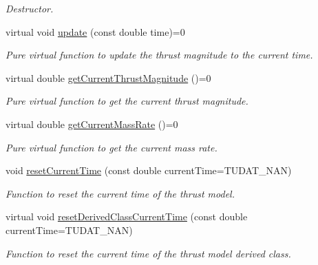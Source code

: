 \begin{DoxyCompactItemize}
\begin{DoxyCompactList}\small\item\em Destructor. \end{DoxyCompactList}\item 
virtual void \hyperlink{classtudat_1_1propulsion_1_1ThrustMagnitudeWrapper_a6a515296199563f2fcece10923d6dcca}{update} (const double time)=0
\begin{DoxyCompactList}\small\item\em Pure virtual function to update the thrust magnitude to the current time. \end{DoxyCompactList}\item 
virtual double \hyperlink{classtudat_1_1propulsion_1_1ThrustMagnitudeWrapper_a303af8ecc94a8e0151a58711700dafe2}{get\+Current\+Thrust\+Magnitude} ()=0
\begin{DoxyCompactList}\small\item\em Pure virtual function to get the current thrust magnitude. \end{DoxyCompactList}\item 
virtual double \hyperlink{classtudat_1_1propulsion_1_1ThrustMagnitudeWrapper_abea551383a711c4fe3e04a77df3d3c0c}{get\+Current\+Mass\+Rate} ()=0
\begin{DoxyCompactList}\small\item\em Pure virtual function to get the current mass rate. \end{DoxyCompactList}\item 
void \hyperlink{classtudat_1_1propulsion_1_1ThrustMagnitudeWrapper_a53398012b76013f2d10b0471847a8f24}{reset\+Current\+Time} (const double current\+Time=T\+U\+D\+A\+T\+\_\+\+N\+AN)
\begin{DoxyCompactList}\small\item\em Function to reset the current time of the thrust model. \end{DoxyCompactList}\item 
virtual void \hyperlink{classtudat_1_1propulsion_1_1ThrustMagnitudeWrapper_acece32d609bb4946504acc94ec86504b}{reset\+Derived\+Class\+Current\+Time} (const double current\+Time=T\+U\+D\+A\+T\+\_\+\+N\+AN)
\begin{DoxyCompactList}\small\item\em Function to reset the current time of the thrust model derived class. \end{DoxyCompactList}\end{DoxyCompactItemize}
